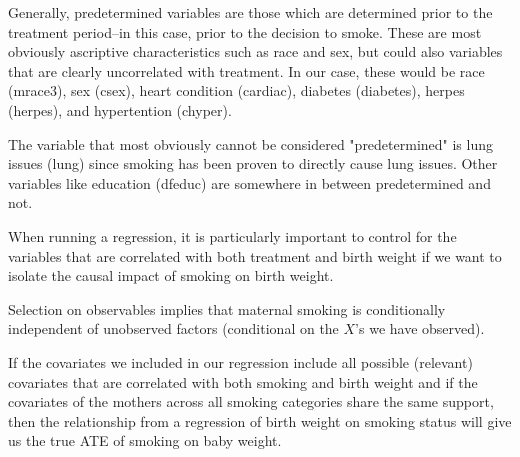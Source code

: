 \documentclass[12pt]{article}
\begin{document}
\vem
{}

Generally, predetermined variables are those which are determined prior to the treatment period--in this case, prior to the decision to smoke. These are most obviously ascriptive characteristics such as race and sex, but could also variables that are clearly uncorrelated with treatment. In our case, these would be race (mrace3), sex (csex), heart condition (cardiac), diabetes (diabetes), herpes (herpes), and hypertention (chyper). 

The variable that most obviously cannot be considered "predetermined" is lung issues (lung) since smoking has been proven to directly cause lung issues. Other variables like education (dfeduc) are somewhere in between predetermined and not.

When running a regression, it is particularly important to control for the variables that are correlated with both treatment and birth weight if we want to isolate the causal impact of smoking on birth weight.

\vem
{}
Selection on observables implies that maternal smoking is conditionally independent of unobserved factors (conditional on the $X$'s we have observed).

If the covariates we included in our regression include all possible (relevant) covariates that are correlated with both smoking and birth weight and if the covariates of the mothers across all smoking categories share the same support, then the relationship from a regression of birth weight on smoking status will give us the true ATE  of smoking on baby weight. 
\end{document}
